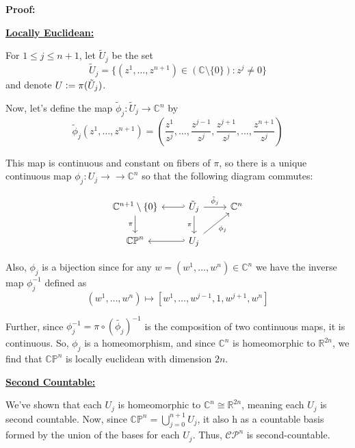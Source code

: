 \documentclass{article}
\newcommand{\R}{\mathbb{R}}
\newcommand{\C}{\mathbb{C}}
\newcommand{\defeq}{\vcentcolon=}
\begin{document}
\vskip 0.5cm
\textbf{Proof:}

\vskip 0.5cm
\underline{\textbf{Locally Euclidean:}}

\vskip 0.25cm
For $1 \leq j \leq n+1$, let $\tilde{U}_j$ be the set 
\[ \tilde{U}_j = \{ (z^1, \dots, z^{n + 1}) \in \left( \C \setminus \{0\} \right) : z^{j} \neq 0 \} \]
and denote $U \defeq \pi(\tilde{U}_j)$.

\vskip 0.25cm
Now, let's define the map $ \tilde{\phi}_j : \tilde{U}_j \rightarrow \C^n $ by 
\[ \tilde{\phi}_j(z^1, \dots, z^{n+1}) = \left( \frac{z^1}{z^j}, \dots, \frac{z^{j - 1}}{z^j}, \frac{z^{j + 1}}{z^j}, \dots, \frac{z^{n+1}}{z^j} \right) \]

\vskip 0.25cm
This map is continuous and constant on fibers of $\pi$, so there is a unique continuous map $\phi_j : U_j \rightarrow \rightarrow \C^n$ so that the following diagram commutes:

\[\begin{tikzcd}
	{\mathbb{C}^{n+1} \setminus \{0\}  } & {\tilde{U}_j} & {\mathbb{C}^n} \\
	{\mathbb{CP}^n} & {U_j}
	\arrow["{\tilde{\phi}_j}", from=1-2, to=1-3]
	\arrow["{\phi_j}"', from=2-2, to=1-3]
	\arrow["\pi"', from=1-2, to=2-2]
	\arrow["\pi"', from=1-1, to=2-1]
	\arrow[hook', from=2-2, to=2-1]
	\arrow[hook', from=1-2, to=1-1]
\end{tikzcd}\]

\vskip 0.25cm
Also, $\phi_j$ is a bijection since for any $w = (w^1, \dots, w^{n}) \in \mathbb{C}^n$ we have the inverse map $\phi_j^{-1}$ defined as 
\[ (w^1, \dots, w^n) \mapsto \left[ w^1, \dots, w^{j-1}, 1, w^{j+1}, w^n \right] \]

Further, since $\phi_j^{-1} = \pi \circ (\tilde{\phi_j})^{-1}$ is the composition of two continuous maps, it is continuous. So, $\phi_j$ is a homeomorphism, and since $\C^n$ is homeomorphic to $\R^{2n}$, we find that $\mathbb{CP}^n$ is locally euclidean with dimension $2n$.

\vskip 1cm
\underline{\textbf{Second Countable:}}

We've shown that each $U_j$ is homeomorphic to $\C^n \cong \R^{2n}$, meaning each $U_j$ is second countable. Now, since $\mathbb{CP}^{n} = \bigcup_{j = 0}^{n+1} U_j$, it also h as a countable basis formed by the union of the bases for each $U_j$. Thus, $\mathcal{CP}^n$ is second-countable.
\end{document}
